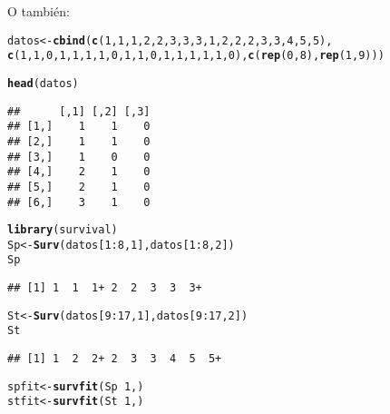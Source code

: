 \documentclass[10pt]{article}\usepackage[]{graphicx}\usepackage[]{color}
\makeatletter
\newcommand{\hlnum}[1]{\textcolor[rgb]{0.686,0.059,0.569}{#1}}%
\newcommand{\hlopt}[1]{\textcolor[rgb]{0,0,0}{#1}}%
\newcommand{\hlstd}[1]{\textcolor[rgb]{0.345,0.345,0.345}{#1}}%
\newcommand{\hlkwb}[1]{\textcolor[rgb]{0.69,0.353,0.396}{#1}}%
\newcommand{\hlkwd}[1]{\textcolor[rgb]{0.737,0.353,0.396}{\textbf{#1}}}%
\newenvironment{kframe}{%
 \def\at@end@of@kframe{}%
 \ifinner\ifhmode%
  \def\at@end@of@kframe{\end{minipage}}%
  \begin{minipage}{\columnwidth}%
 \fi\fi%
 \def\FrameCommand##1{\hskip\@totalleftmargin \hskip-\fboxsep
 \colorbox{shadecolor}{##1}\hskip-\fboxsep
     \hskip-\linewidth \hskip-\@totalleftmargin \hskip\columnwidth}%
 \MakeFramed {\advance\hsize-\width
   \@totalleftmargin\z@ \linewidth\hsize
   \@setminipage}}%
 {\par\unskip\endMakeFramed%
 \at@end@of@kframe}
\newenvironment{knitrout}{}{} %
\makeatother
\begin{document}
{\begin{itemize}
O también: 
\begin{knitrout}
\color{fgcolor}\begin{kframe}
\begin{alltt}
\hlstd{datos}\hlkwb{<-}\hlkwd{cbind}\hlstd{(}\hlkwd{c}\hlstd{(}\hlnum{1}\hlstd{,}\hlnum{1}\hlstd{,}\hlnum{1}\hlstd{,}\hlnum{2}\hlstd{,}\hlnum{2}\hlstd{,}\hlnum{3}\hlstd{,}\hlnum{3}\hlstd{,}\hlnum{3}\hlstd{,}\hlnum{1}\hlstd{,}\hlnum{2}\hlstd{,}\hlnum{2}\hlstd{,}\hlnum{2}\hlstd{,}\hlnum{3}\hlstd{,}\hlnum{3}\hlstd{,}\hlnum{4}\hlstd{,}\hlnum{5}\hlstd{,}\hlnum{5}\hlstd{),}
             \hlkwd{c}\hlstd{(}\hlnum{1}\hlstd{,}\hlnum{1}\hlstd{,}\hlnum{0}\hlstd{,}\hlnum{1}\hlstd{,}\hlnum{1}\hlstd{,}\hlnum{1}\hlstd{,}\hlnum{1}\hlstd{,}\hlnum{0}\hlstd{,}\hlnum{1}\hlstd{,}\hlnum{1}\hlstd{,}\hlnum{0}\hlstd{,}\hlnum{1}\hlstd{,}\hlnum{1}\hlstd{,}\hlnum{1}\hlstd{,}\hlnum{1}\hlstd{,}\hlnum{1}\hlstd{,}\hlnum{0}\hlstd{),}\hlkwd{c}\hlstd{(}\hlkwd{rep}\hlstd{(}\hlnum{0}\hlstd{,}\hlnum{8}\hlstd{),}\hlkwd{rep}\hlstd{(}\hlnum{1}\hlstd{,}\hlnum{9}\hlstd{)))}

\hlkwd{head}\hlstd{(datos)}
\end{alltt}
\begin{verbatim}
##      [,1] [,2] [,3]
## [1,]    1    1    0
## [2,]    1    1    0
## [3,]    1    0    0
## [4,]    2    1    0
## [5,]    2    1    0
## [6,]    3    1    0
\end{verbatim}
\begin{alltt}
\hlkwd{library}\hlstd{(survival)}
\hlstd{Sp}\hlkwb{<-}\hlkwd{Surv}\hlstd{(datos[}\hlnum{1}\hlopt{:}\hlnum{8}\hlstd{,}\hlnum{1}\hlstd{],datos[}\hlnum{1}\hlopt{:}\hlnum{8}\hlstd{,}\hlnum{2}\hlstd{])}
\hlstd{Sp}
\end{alltt}
\begin{verbatim}
## [1] 1  1  1+ 2  2  3  3  3+
\end{verbatim}
\begin{alltt}
\hlstd{St}\hlkwb{<-}\hlkwd{Surv}\hlstd{(datos[}\hlnum{9}\hlopt{:}\hlnum{17}\hlstd{,}\hlnum{1}\hlstd{],datos[}\hlnum{9}\hlopt{:}\hlnum{17}\hlstd{,}\hlnum{2}\hlstd{])}
\hlstd{St}
\end{alltt}
\begin{verbatim}
## [1] 1  2  2+ 2  3  3  4  5  5+
\end{verbatim}
\begin{alltt}
\hlstd{spfit}\hlkwb{<-}\hlkwd{survfit}\hlstd{(Sp}\hlopt{~}\hlnum{1}\hlstd{,)}
\hlstd{stfit}\hlkwb{<-}\hlkwd{survfit}\hlstd{(St}\hlopt{~}\hlnum{1}\hlstd{,)}



\end{alltt}
\end{kframe}
\end{knitrout}
\end{itemize}}
\end{document}
